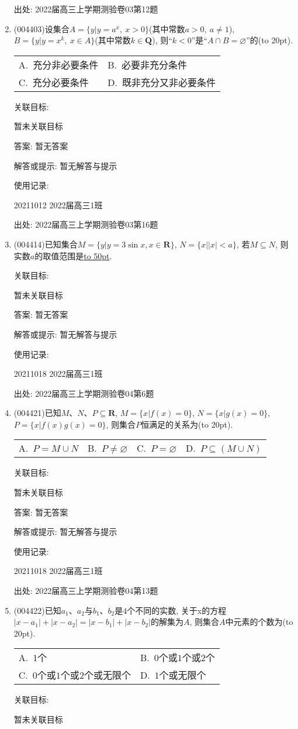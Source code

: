 \documentclass[10pt,a4paper]{article}
\newcommand{\blank}[1]{\underline{\hbox to #1pt{}}}
\newcommand{\bracket}[1]{(\hbox to #1pt{})}
\newcommand{\twoch}[4]{\par\begin{tabular}{p{.46\textwidth}p{.46\textwidth}}
A.~#1& B.~#2\\
C.~#3& D.~#4
\end{tabular}}
\newcommand{\fourch}[4]{\par\begin{tabular}{p{.23\textwidth}p{.23\textwidth}p{.23\textwidth}p{.23\textwidth}}
A.~#1 &B.~#2& C.~#3& D.~#4
\end{tabular}}
\begin{document}
\begin{enumerate}[1.]
出处: 2022届高三上学期测验卷03第12题
\item { (004403)}设集合$A=\{y|y=a^x,\ x>0\}$(其中常数$a>0,  \ a\ne 1$), $B=\{y|y=x^k,\ x\in A\}$(其中常数$k\in \mathbf{Q}$), 则``$k<0$''是``$A\cap B=\varnothing$''的\bracket{20}.
\twoch{充分非必要条件}{必要非充分条件}{充分必要条件}{既非充分又非必要条件}


关联目标:

暂未关联目标

答案: 暂无答案

解答或提示: 暂无解答与提示

使用记录:

20211012	2022届高三1班	


出处: 2022届高三上学期测验卷03第16题
\item { (004414)}已知集合$M=\{y|y=3\sin x,x\in \mathbf{R}\}$, $N=\{x||x|<a\}$, 若$M\subseteq N$, 则实数$a$的取值范围是\blank{50}.


关联目标:

暂未关联目标

答案: 暂无答案

解答或提示: 暂无解答与提示

使用记录:

20211018	2022届高三1班	


出处: 2022届高三上学期测验卷04第6题
\item { (004421)}已知$M$、$N$、$P\subseteq \mathbf{R}$, $M=\{x|f(x)=0\}$, $N=\{x|g(x)=0\}$, $P=\{x|f(x)g(x)=0\}$, 则集合$P$恒满足的关系为\bracket{20}.
\fourch{$P=M\cup N$}{$P\ne \varnothing$}{$P=\varnothing$}{$P\subseteq (M\cup N)$}


关联目标:

暂未关联目标

答案: 暂无答案

解答或提示: 暂无解答与提示

使用记录:

20211018	2022届高三1班	


出处: 2022届高三上学期测验卷04第13题
\item { (004422)}已知$a_1$、$a_2$与$b_1$、$b_2$是$4$个不同的实数, 关于x的方程$|x-a_1|+|x-a_2|=|x-b_1|+|x-b_2|$的解集为$A$, 则集合$A$中元素的个数为\bracket{20}.
\twoch{$1$个}{$0$个或$1$个或$2$个}{$0$个或$1$个或$2$个或无限个}{$1$个或无限个}


关联目标:

暂未关联目标


\end{enumerate}
\end{document}
